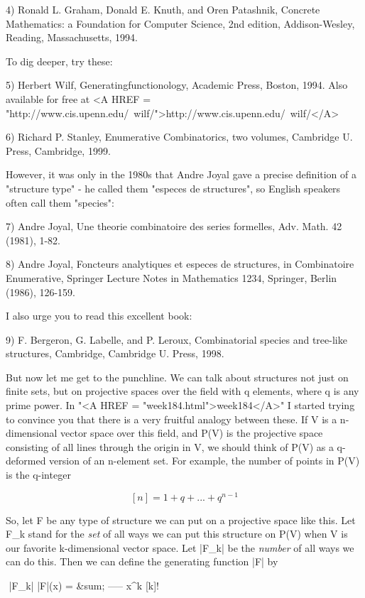 4)  Ronald L. Graham, Donald E. Knuth, and Oren Patashnik,
Concrete Mathematics: a Foundation for Computer Science, 
2nd edition, Addison-Wesley, Reading, Massachusetts, 1994.

To dig deeper, try these:

5) Herbert Wilf, Generatingfunctionology, Academic Press, Boston,
1994. Also available for free at <A HREF = "http://www.cis.upenn.edu/~wilf/">http://www.cis.upenn.edu/~wilf/</A>

6) Richard P. Stanley, Enumerative Combinatorics, two volumes, 
Cambridge U. Press, Cambridge, 1999.

However, it was only in the 1980s that Andre Joyal gave a precise
definition of a "structure type" - he called them "especes de structures",
so English speakers often call them "species":

7) Andre Joyal, Une theorie combinatoire des series formelles,
Adv. Math. 42 (1981), 1-82.

8) Andre Joyal, Foncteurs analytiques et especes de structures, 
in Combinatoire Enumerative, Springer Lecture Notes in Mathematics
1234, Springer, Berlin (1986), 126-159.

I also urge you to read this excellent book:

9) F. Bergeron, G. Labelle, and P. Leroux, Combinatorial species and
tree-like structures, Cambridge, Cambridge U. Press, 1998.

But now let me get to the punchline.  We can talk about structures not
just on finite sets, but on projective spaces over the field with  
q elements, where q is any prime power.  In "<A HREF = "week184.html">week184</A>" I started trying 
to convince you that there is a very fruitful analogy between these.
If V is a n-dimensional vector space over this field, and P(V) is the
projective space consisting of all lines through the origin in V, we
should think of P(V) as a q-deformed version of an n-element set.  For
example, the number of points in P(V) is the q-integer

$$
[n] = 1 + q + ... + q^{n-1}
$$
    

So, let F be any type of structure we can put on a projective space like
this.  Let F_{k} stand for the \emph{set} 
of all ways we can put this structure
on P(V) when V is our favorite k-dimensional vector space.  Let |F_{k}| be
the \emph{number} of all ways we can do this.  Then we can define the
generating function |F| by

$$
              |F_{k}| 
|F|(x) =  &sum;  -----  x^{k}
              [k]!

